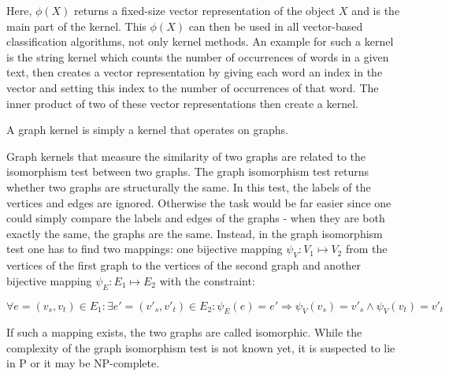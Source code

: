 Here, $\phi(X)$ returns a fixed-size vector representation of the object $X$ and is the main part of the kernel.
This $\phi(X)$ can then be used in all vector-based classification algorithms, not only kernel methods.
An example for such a kernel is the string kernel which counts the number of occurrences of words in a given text, then creates a vector representation by giving each word an index in the vector and setting this index to the number of occurrences of that word. The inner product of two of these vector representations then create a kernel.

A graph kernel is simply a kernel that operates on graphs.

Graph kernels that measure the similarity of two graphs are related to the isomorphism test between two graphs.
The graph isomorphism test returns whether two graphs are structurally the same.
In this test, the labels of the vertices and edges are ignored. Otherwise the task would be far easier since one could simply compare the labels and edges of the graphs - when they are both exactly the same, the graphs are the same.
Instead, in the graph isomorphism test one has to find two mappings: one bijective mapping $\psi_{V}: V_1 \mapsto V_2$ from the vertices of the first graph to the vertices of the second graph and another bijective mapping $\psi_{E}: E_1 \mapsto E_2$ with the constraint:

\begin{equation*}
    \forall e = (v_s, v_t) \in E_1:
    \exists e' = (v'_s, v'_t) \in E_2:
    \psi_{E}(e) = e'
    \Rightarrow
    \psi_{V}(v_s) = v'_s
    \land
    \psi_{V}(v_t) = v'_t
\end{equation*}

If such a mapping exists, the two graphs are called isomorphic.
While the complexity of the graph isomorphism test is not known yet, it is suspected to lie in P or it may be NP-complete.



